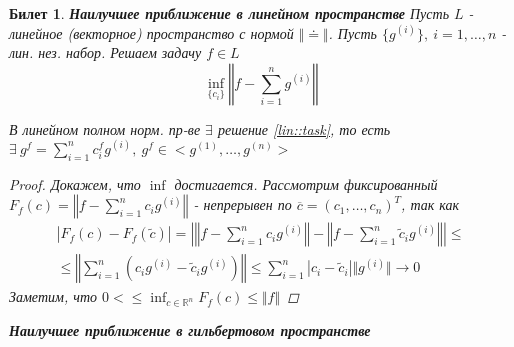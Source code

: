 \documentclass[10pt, twocolumn]{report}
\newtheorem{ticket}{Билет}
\def\R{ \mathbb{R} }
\begin{document}


\begin{ticket}
  \textbf{Наилучшее приближение в линейном пространстве}
  Пусть $L$ - линейное (векторное) пространство с нормой $\Vert\doteq\Vert$.
  Пусть $\{g^{(i)}\},\ i=1,\ldots,n$ - лин. нез. набор.
  Решаем задачу $f\in L$
  \begin{equation}\label{lin::task}
    \inf_{\{c_i\}}\left\Vert f-\sum_{i=1}^ng^{(i)}\right\Vert
  \end{equation}
  \begin{theorem}
    В линейном полном норм. пр-ве $\exists$ решение \eqref{lin::task}, то есть $\exists\ g^f=\sum_{i=1}^nc_i^fg^{(i)},\ g^f\in<g^{(1)},\ldots,g^{(n)}>$
  \end{theorem}
  \begin{proof}
    Докажем, что $\inf$ достигается.
    Рассмотрим фиксированный $F_f(c)=\left\Vert f-\sum_{i=1}^nc_ig^{(i)}\right\Vert$ - непрерывен по $\overline{c}=(c_1,\ldots,c_n)^T$, так как
    \begin{multline*}
      \left|F_f(c)-F_f(\tilde{c})\right|=\left|\left\Vert f-\sum_{i=1}^nc_ig^{(i)}\right\Vert-\left\Vert f-\sum_{i=1}^n\tilde{c}_ig^{(i)}\right\Vert\right|\leq\\
      \leq \left\Vert \sum_{i=1}^n(c_ig^{(i)}-\tilde{c}_ig^{(i)})\right\Vert\leq\sum_{i=1}^n\left|c_i-\tilde{c}_i\right|\Vert g^{(i)}\Vert\rightarrow0
    \end{multline*}
    Заметим, что $0<\leq\inf_{c\in\R^n}F_f(c)\leq\Vert f\Vert$
  \end{proof}
  \textbf{Наилучшее приближение в гильбертовом пространстве}
\end{ticket}
\end{document}
